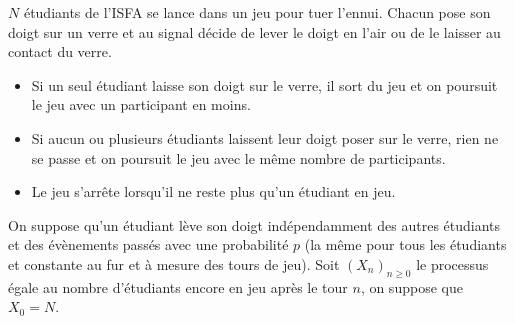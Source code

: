 \documentclass[11pt, addpoints, answers]{exam}
\begin{document}
\begin{questions}
\question $N$ étudiants de l'ISFA se lance dans un jeu pour tuer l'ennui. Chacun pose son doigt sur un verre et au signal décide de lever le doigt en l'air ou de le laisser au contact du verre. 
\begin{itemize}
  \item Si un seul étudiant laisse son doigt sur le verre, il sort du jeu et on poursuit le jeu avec un participant en moins. 
  \item Si aucun ou plusieurs étudiants laissent leur doigt poser sur le verre, rien ne se passe et on poursuit le jeu 
  avec le même nombre de participants. 
  \item Le jeu s'arrête lorsqu'il ne reste plus qu'un étudiant en jeu.
\end{itemize}
On suppose qu'un étudiant lève son doigt indépendamment des autres étudiants et des évènements passés avec une probabilité $p$ (la même pour tous les étudiants et constante au fur et à mesure des tours de jeu). Soit $(X_n)_{n\geq0}$ le processus égale au nombre d'étudiants encore en jeu après le tour $n$, on suppose que $X_0=N$.
\begin{parts}

\end{parts}
\end{questions}
\end{document}
